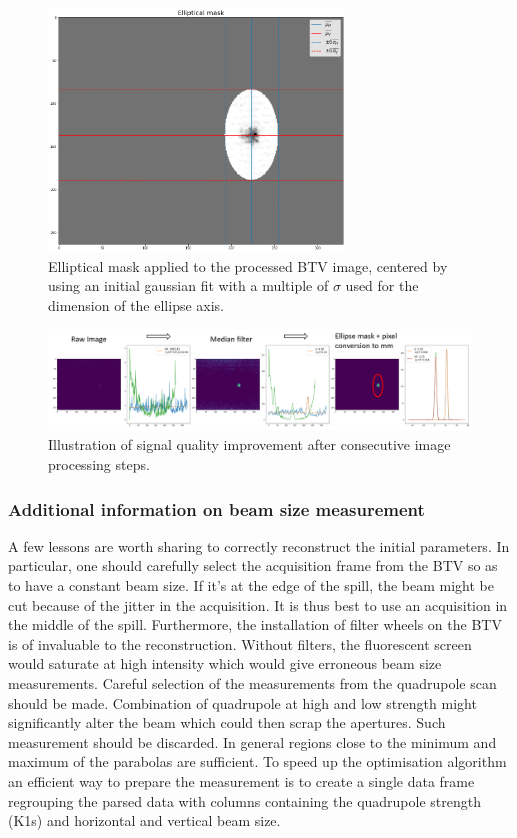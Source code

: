 \begin{figure}[htbp]
\centering
\includegraphics[width=0.7\textwidth]{03_Empirical_Measurements/images/elliptical_mask.png}
\caption{Elliptical mask applied to the processed BTV image, centered by using an initial gaussian fit with a multiple of $\sigma$ used for the dimension of the ellipse axis.}
\label{fig:elliptical_mask}
\end{figure}

\begin{figure}[htbp]
\centering
\includegraphics[width=\textwidth]{03_Empirical_Measurements/images/image_processing.png}
\caption{Illustration of signal quality improvement after consecutive image processing steps.}
\label{fig:image_processing}
\end{figure}

\subsubsection{Additional information on beam size measurement}

A few lessons are worth sharing to correctly reconstruct the initial parameters. In particular, one should carefully select the acquisition frame from the BTV so as to have a constant beam size. If it's at the edge of the spill, the beam might be cut because of the jitter in the acquisition. It is thus best to use an acquisition in the middle of the spill. Furthermore, the installation of filter wheels on the BTV is of invaluable to the reconstruction. Without filters, the fluorescent screen would saturate at high intensity which would give erroneous beam size measurements. Careful selection of the measurements from the quadrupole scan should be made. Combination of quadrupole at high and low strength might significantly alter the beam which could then scrap the apertures. Such measurement should be discarded. In general regions close to the minimum and maximum of the parabolas are sufficient. To speed up the optimisation algorithm an efficient way to prepare the measurement is to create a single data frame regrouping the parsed data with columns containing the quadrupole strength (K1s) and horizontal and vertical beam size.


